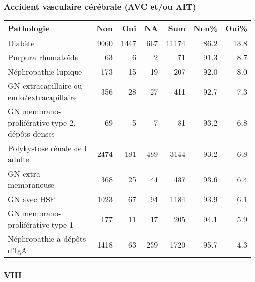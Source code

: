 \documentclass[11pt,a4paper]{article}\usepackage[]{graphicx}\usepackage[]{color}
\begin{document}
\subsubsection*{Accident vasculaire cérébrale (AVC et/ou AIT)}



\begin{table}[H]
\centering
\begin{tabular}{lrrrrrr}
  \hline
Pathologie & Non & Oui & NA & Sum & Non\% & Oui\% \\ 
  \hline
Diabète & 9060 & 1447 & 667 & 11174 & 86.2 & 13.8 \\ 
  Purpura rhumatoïde & 63 &  6 &  2 & 71 & 91.3 & 8.7 \\ 
  Néphropathie lupique & 173 & 15 & 19 & 207 & 92.0 & 8.0 \\ 
  GN extracapillaire ou endo/extracapillaire & 356 & 28 & 27 & 411 & 92.7 & 7.3 \\ 
  GN membrano-proliférative type 2, dépôts denses & 69 &  5 &  7 & 81 & 93.2 & 6.8 \\ 
  Polykystose rénale de l adulte & 2474 & 181 & 489 & 3144 & 93.2 & 6.8 \\ 
  GN extra-membraneuse & 368 & 25 & 44 & 437 & 93.6 & 6.4 \\ 
  GN avec HSF & 1023 & 67 & 94 & 1184 & 93.9 & 6.1 \\ 
  GN membrano-proliférative type 1 & 177 & 11 & 17 & 205 & 94.1 & 5.9 \\ 
  Néphropathie à dépôts d'IgA & 1418 & 63 & 239 & 1720 & 95.7 & 4.3 \\ 
   \hline
\end{tabular}
\end{table}


\subsubsection*{VIH}
\end{document}
